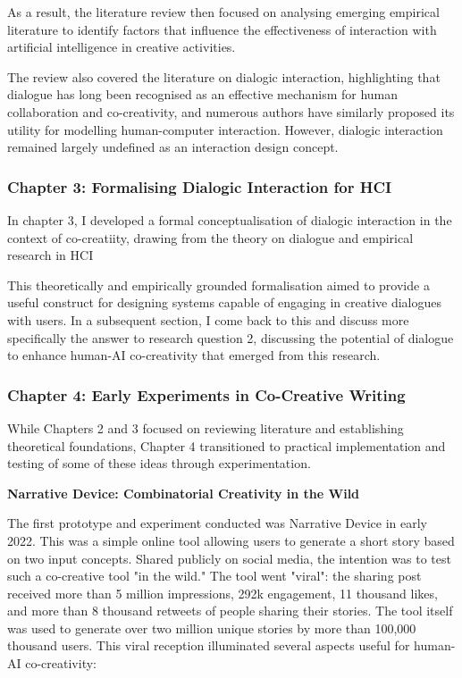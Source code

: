 As a result, the literature review then focused on analysing emerging empirical literature to identify factors that influence the effectiveness of interaction with artificial intelligence in creative activities. 

The review also covered the literature on dialogic interaction, highlighting that dialogue has long been recognised as an effective mechanism for human collaboration and co-creativity, and numerous authors have similarly proposed its utility for modelling human-computer interaction. However, dialogic interaction remained largely undefined as an interaction design concept. 

\subsubsection{\textbf{Chapter 3: Formalising Dialogic Interaction for HCI}}

In chapter 3, I developed a formal conceptualisation of dialogic interaction in the context of co-creatiity, drawing from the theory on dialogue and empirical research in HCI 

This theoretically and empirically grounded formalisation aimed to provide a useful construct for designing systems capable of engaging in creative dialogues with users. In a subsequent section, I come back to this and discuss more specifically the answer to research question 2, discussing the potential of dialogue to enhance human-AI co-creativity that emerged from this research. 

\subsubsection{\textbf{Chapter 4: Early Experiments in Co-Creative Writing}}

While Chapters 2 and 3 focused on reviewing literature and establishing theoretical foundations, Chapter 4 transitioned to practical implementation and testing of some of these ideas through experimentation.

\textbf{Narrative Device: Combinatorial Creativity in the Wild}

The first prototype and experiment conducted was Narrative Device in early 2022. This was a simple online tool allowing users to generate a short story based on two input concepts. Shared publicly on social media, the intention was to test such a co-creative tool "in the wild." The tool went "viral": the sharing post received more than 5 million impressions, 292k engagement, 11 thousand likes, and more than 8 thousand retweets of people sharing their stories. The tool itself was used to generate over two million unique stories by more than 100,000 thousand users. This viral reception illuminated several aspects useful for human-AI co-creativity:

